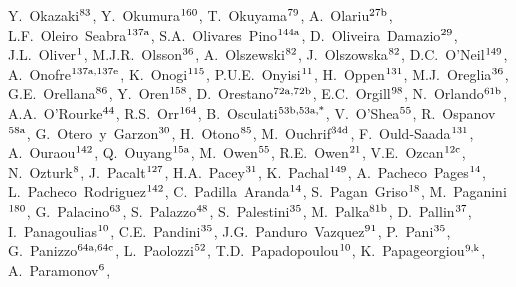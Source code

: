 \begin{flushleft}
Y.~Okazaki$^\textrm{\scriptsize 83}$,    
Y.~Okumura$^\textrm{\scriptsize 160}$,    
T.~Okuyama$^\textrm{\scriptsize 79}$,    
A.~Olariu$^\textrm{\scriptsize 27b}$,    
L.F.~Oleiro~Seabra$^\textrm{\scriptsize 137a}$,    
S.A.~Olivares~Pino$^\textrm{\scriptsize 144a}$,    
D.~Oliveira~Damazio$^\textrm{\scriptsize 29}$,    
J.L.~Oliver$^\textrm{\scriptsize 1}$,    
M.J.R.~Olsson$^\textrm{\scriptsize 36}$,    
A.~Olszewski$^\textrm{\scriptsize 82}$,    
J.~Olszowska$^\textrm{\scriptsize 82}$,    
D.C.~O'Neil$^\textrm{\scriptsize 149}$,    
A.~Onofre$^\textrm{\scriptsize 137a,137e}$,    
K.~Onogi$^\textrm{\scriptsize 115}$,    
P.U.E.~Onyisi$^\textrm{\scriptsize 11}$,    
H.~Oppen$^\textrm{\scriptsize 131}$,    
M.J.~Oreglia$^\textrm{\scriptsize 36}$,    
G.E.~Orellana$^\textrm{\scriptsize 86}$,    
Y.~Oren$^\textrm{\scriptsize 158}$,    
D.~Orestano$^\textrm{\scriptsize 72a,72b}$,    
E.C.~Orgill$^\textrm{\scriptsize 98}$,    
N.~Orlando$^\textrm{\scriptsize 61b}$,    
A.A.~O'Rourke$^\textrm{\scriptsize 44}$,    
R.S.~Orr$^\textrm{\scriptsize 164}$,    
B.~Osculati$^\textrm{\scriptsize 53b,53a,*}$,    
V.~O'Shea$^\textrm{\scriptsize 55}$,    
R.~Ospanov$^\textrm{\scriptsize 58a}$,    
G.~Otero~y~Garzon$^\textrm{\scriptsize 30}$,    
H.~Otono$^\textrm{\scriptsize 85}$,    
M.~Ouchrif$^\textrm{\scriptsize 34d}$,    
F.~Ould-Saada$^\textrm{\scriptsize 131}$,    
A.~Ouraou$^\textrm{\scriptsize 142}$,    
Q.~Ouyang$^\textrm{\scriptsize 15a}$,    
M.~Owen$^\textrm{\scriptsize 55}$,    
R.E.~Owen$^\textrm{\scriptsize 21}$,    
V.E.~Ozcan$^\textrm{\scriptsize 12c}$,    
N.~Ozturk$^\textrm{\scriptsize 8}$,    
J.~Pacalt$^\textrm{\scriptsize 127}$,    
H.A.~Pacey$^\textrm{\scriptsize 31}$,    
K.~Pachal$^\textrm{\scriptsize 149}$,    
A.~Pacheco~Pages$^\textrm{\scriptsize 14}$,    
L.~Pacheco~Rodriguez$^\textrm{\scriptsize 142}$,    
C.~Padilla~Aranda$^\textrm{\scriptsize 14}$,    
S.~Pagan~Griso$^\textrm{\scriptsize 18}$,    
M.~Paganini$^\textrm{\scriptsize 180}$,    
G.~Palacino$^\textrm{\scriptsize 63}$,    
S.~Palazzo$^\textrm{\scriptsize 48}$,    
S.~Palestini$^\textrm{\scriptsize 35}$,    
M.~Palka$^\textrm{\scriptsize 81b}$,    
D.~Pallin$^\textrm{\scriptsize 37}$,    
I.~Panagoulias$^\textrm{\scriptsize 10}$,    
C.E.~Pandini$^\textrm{\scriptsize 35}$,    
J.G.~Panduro~Vazquez$^\textrm{\scriptsize 91}$,    
P.~Pani$^\textrm{\scriptsize 35}$,    
G.~Panizzo$^\textrm{\scriptsize 64a,64c}$,    
L.~Paolozzi$^\textrm{\scriptsize 52}$,    
T.D.~Papadopoulou$^\textrm{\scriptsize 10}$,    
K.~Papageorgiou$^\textrm{\scriptsize 9,k}$,    
A.~Paramonov$^\textrm{\scriptsize 6}$,    

\end{flushleft}
